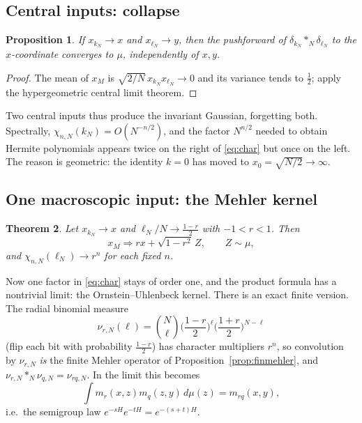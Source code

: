 \documentclass[11pt,reqno]{amsart}
\newtheorem{theorem}{Theorem}[section]
\newtheorem{proposition}[theorem]{Proposition}
\theoremstyle{definition}
\theoremstyle{remark}
\begin{document}
\subsection{Central inputs: collapse}
\begin{proposition}\label{prop:collapse}
If $x_{k_N}\to x$ and $x_{\ell_N}\to y$, then the pushforward of
$\delta_{k_N}*_N\delta_{\ell_N}$ to the $x$-coordinate converges to $\mu$,
independently of $x,y$.
\end{proposition}
\begin{proof}
The mean of $x_M$ is $\sqrt{2/N}\,x_{k_N}x_{\ell_N}\to0$ and its variance
tends to $\frac12$; apply the hypergeometric central limit theorem.
\end{proof}
Two central inputs thus produce the invariant Gaussian, forgetting both.
Spectrally, $\chi_{n,N}(k_N)=O(N^{-n/2})$, and the factor $N^{n/2}$ needed
to obtain Hermite polynomials appears twice on the right of
\eqref{eq:char} but once on the left. The reason is geometric: the
identity $k=0$ has moved to $x_0=\sqrt{N/2}\to\infty$.

\subsection{One macroscopic input: the Mehler kernel}
\begin{theorem}\label{thm:mixed}
Let $x_{k_N}\to x$ and $\ell_N/N\to\frac{1-r}2$ with $-1<r<1$. Then
\[
x_M\Longrightarrow rx+\sqrt{1-r^2}\,Z,\qquad Z\sim\mu,
\]
and $\chi_{n,N}(\ell_N)\to r^n$ for each fixed $n$.
\end{theorem}
Now one factor in \eqref{eq:char} stays of order one, and the product
formula has a nontrivial limit: the Ornstein--Uhlenbeck kernel. There
is an exact finite version. The radial binomial measure
\[
\nu_{r,N}(\ell)=\binom N\ell\Big(\frac{1-r}2\Big)^\ell\Big(\frac{1+r}2\Big)^{N-\ell}
\]
(flip each bit with probability $\frac{1-r}{2}$) has character
multipliers $r^n$, so convolution by $\nu_{r,N}$ \emph{is} the finite
Mehler operator of Proposition~\ref{prop:finmehler}, and
$\nu_{r,N}*_N\nu_{q,N}=\nu_{rq,N}$. In the limit this becomes
\[
\int m_r(x,z)m_q(z,y)\,d\mu(z)=m_{rq}(x,y),
\]
i.e.\ the semigroup law $e^{-sH}e^{-tH}=e^{-(s+t)H}$.
\end{document}
